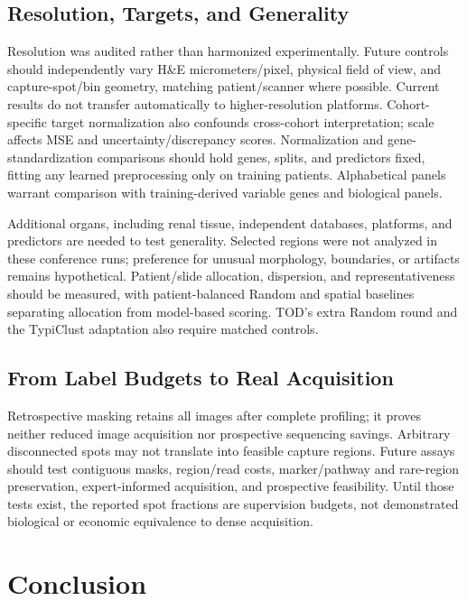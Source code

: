 \documentclass[]{spie}
\begin{document}
\subsection{Resolution, Targets, and Generality}

Resolution was audited rather than harmonized experimentally. Future controls should independently vary H\&E micrometers/pixel, physical field of view, and capture-spot/bin geometry, matching patient/scanner where possible. Current results do not transfer automatically to higher-resolution platforms. Cohort-specific target normalization also confounds cross-cohort interpretation; scale affects MSE and uncertainty/discrepancy scores. Normalization and gene-standardization comparisons should hold genes, splits, and predictors fixed, fitting any learned preprocessing only on training patients. Alphabetical panels warrant comparison with training-derived variable genes and biological panels.

Additional organs, including renal tissue, independent databases, platforms, and predictors are needed to test generality. Selected regions were not analyzed in these conference runs; preference for unusual morphology, boundaries, or artifacts remains hypothetical. Patient/slide allocation, dispersion, and representativeness should be measured, with patient-balanced Random and spatial baselines separating allocation from model-based scoring. TOD's extra Random round and the TypiClust adaptation also require matched controls.

\subsection{From Label Budgets to Real Acquisition}

Retrospective masking retains all images after complete profiling; it proves neither reduced image acquisition nor prospective sequencing savings. Arbitrary disconnected spots may not translate into feasible capture regions. Future assays should test contiguous masks, region/read costs, marker/pathway and rare-region preservation, expert-informed acquisition, and prospective feasibility. Until those tests exist, the reported spot fractions are supervision budgets, not demonstrated biological or economic equivalence to dense acquisition.

\section{Conclusion}
\end{document}
